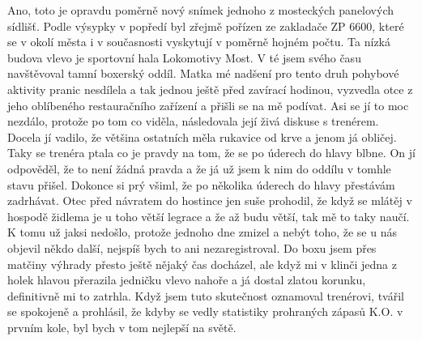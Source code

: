 
Ano, toto je opravdu poměrně nový snímek jednoho z mosteckých
panelových sídlišť. Podle výsypky v popředí byl zřejmě pořízen ze
zakladače ZP 6600, které se v okolí města i v současnosti vyskytují v
poměrně hojném počtu. Ta nízká budova vlevo je sportovní hala
Lokomotivy Most. V té jsem svého času navštěvoval tamní boxerský
oddíl. Matka mé nadšení pro tento druh pohybové aktivity pranic
nesdílela a tak jednou ještě před zavírací hodinou, vyzvedla otce z
jeho oblíbeného restauračního zařízení a přišli se na mě podívat. Asi
se jí to moc nezdálo, protože po tom co viděla, následovala její živá
diskuse s trenérem. Docela jí vadilo, že většina ostatních měla
rukavice od krve a jenom já obličej. Taky se trenéra ptala co je
pravdy na tom, že se po úderech do hlavy blbne. On jí odpověděl, že to
není žádná pravda a že já už jsem k nim do oddílu v tomhle stavu
přišel. Dokonce si prý všiml, že po několika úderech do hlavy
přestávám zadrhávat. Otec před návratem do hostince jen suše prohodil,
že když se mlátěj v hospodě židlema je u toho větší legrace a že až
budu větší, tak mě to taky naučí. K tomu už jaksi nedošlo, protože
jednoho dne zmizel a nebýt toho, že se u nás objevil někdo další,
nejspíš bych to ani nezaregistroval. Do boxu jsem přes matčiny výhrady
přesto ještě nějaký čas docházel, ale když mi v klinči jedna z holek
hlavou přerazila jedničku vlevo nahoře a já dostal zlatou korunku,
definitivně mi to zatrhla. Když jsem tuto skutečnost oznamoval
trenérovi, tvářil se spokojeně a prohlásil, že kdyby se vedly
statistiky prohraných zápasů K.O. v prvním kole, byl bych v tom
nejlepší na světě.


